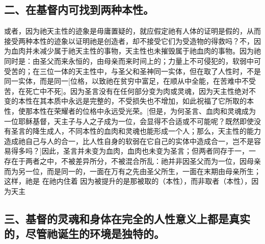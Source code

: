 \subsection{二、在基督内可找到两种本性。}

或者，因为祂天主性的迹象是毋庸置疑的，就应假定祂有人体的证明是假的，从而接受两种本性的迹象以证明祂是创造者，却不接受它们为受造物的得救吗？不，因为血肉并未减少属于祂天主性的事物，天主性也未摧毁属于祂血肉的事物。因为祂同时是：由圣父而来永恒的，由母亲而来时间上的；力量上不可侵犯的，软弱中可受苦的；在三位一体的天主性中，与圣父和圣神同一实体，但在取了人性时，不是同一实体，而是同一[位格，以致祂在贫穷中富足，在顺从中全能，在苦难中不受苦，在死亡中不死]。因为圣言没有在任何部分变为肉或灵魂，因为天主性绝对不变的本性在其本质中永远是完整的，不受损失也不增加，如此祝福了它所取的本性，使那本性在荣耀者的位格中永远受光荣。[但是，为何圣言、血肉和灵魂成为一位耶稣基督，天主子与人之子成为一位，会显得不合适或不可能呢？既然即使没有圣言的降生成人，不同本性的血肉和灵魂也能形成一个人；那么，天主性的能力造成祂自己与人的合一，比人性自身的软弱在它自己的实体中造成合一，岂不是容易得多吗？]因此，圣言并未变为血肉，血肉也未变为圣言；但两者同存于一，一存在于两者之中，不被差异所分，不被混合所乱：祂并非因圣父而为一位，因母亲而为另一位，而是同一的，一面在万有之先由圣父所生，一面在末期由母亲所生；这样，祂是 在祂内住着 因为被提升的是那被取的（本性），而非取者（本性），因为天主\par


\subsection{三、基督的灵魂和身体在完全的人性意义上都是真实的，尽管祂诞生的环境是独特的。}

